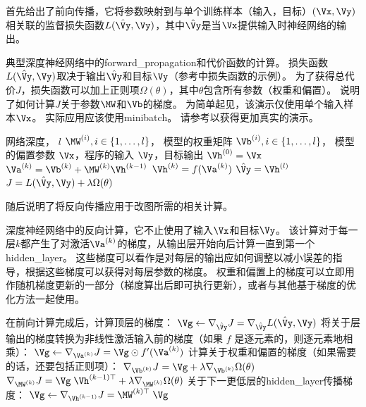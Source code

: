 首先给出了前向传播，它将参数映射到与单个训练样本（输入，目标）$(\Vx,\Vy)$相关联的监督损失函数$L(\hat{\Vy}, \Vy)$，其中$\hat{\Vy}$是当$\Vx$提供输入时神经网络的输出。
\begin{algorithm}[ht]
\caption{典型深度神经网络中的\gls{forward_propagation}和代价函数的计算。
损失函数$L(\hat{\Vy}, \Vy)$取决于输出$\hat{\Vy}$和目标$\Vy$（参考中损失函数的示例）。
为了获得总代价$J$，损失函数可以加上正则项$\Omega(\theta)$，其中$\theta$包含所有参数（权重和偏置）。
说明了如何计算$J$关于参数$\MW$和$\Vb$的梯度。 为简单起见，该演示仅使用单个输入样本$\Vx$。
实际应用应该使用\gls{minibatch}。
请参考以获得更加真实的演示。}
\label{alg:mlp-fprop}
\begin{algorithmic}
\REQUIRE 网络深度， $l$
\REQUIRE $\MW^{(i)}, i \in \{ 1, \dots, l\}$， 模型的权重矩阵
\REQUIRE $\Vb^{(i)}, i \in \{ 1, \dots, l\}$， 模型的偏置参数
\REQUIRE $\Vx$，程序的输入
\REQUIRE $\Vy$，目标输出
\STATE $\Vh^{(0)}=\Vx$
 \STATE $\Va^{(k)} = \Vb^{(k)} + \MW^{(k)} \Vh^{(k-1)}$
 \STATE $\Vh^{(k)} = f(\Va^{(k)})$
\ENDFOR
\STATE $\hat{\Vy} = \Vh^{(l)}$
\STATE $J = L(\hat{\Vy},\Vy) + \lambda \Omega(\theta)$
\end{algorithmic}
\end{algorithm}

随后说明了将反向传播应用于改图所需的相关计算。
\begin{algorithm}[htbp]
\caption{深度神经网络中的反向计算，它不止使用了输入$\Vx $和目标$\Vy$。
该计算对于每一层$k$都产生了对激活$\Va^{(k)}$的梯度，从输出层开始向后计算一直到第一个\gls{hidden_layer}。
这些梯度可以看作是对每层的输出应如何调整以减小误差的指导，根据这些梯度可以获得对每层参数的梯度。
权重和偏置上的梯度可以立即用作随机梯度更新的一部分（梯度算出后即可执行更新），或者与其他基于梯度的优化方法一起使用。
}
\label{alg:mlp-bprop}
\begin{algorithmic}
\STATE 在前向计算完成后，计算顶层的梯度：
\STATE $\Vg \leftarrow \nabla_{\hat{\Vy}} J = \nabla_{\hat{\Vy}} L(\hat{\Vy},\Vy)$
\STATE 将关于层输出的梯度转换为非线性激活输入前的梯度（如果 $f$ 是逐元素的，则逐元素地相乘）：
  \STATE $\Vg \leftarrow \nabla_{\Va^{(k)}} J = \Vg \odot f'(\Va^{(k)})$
  \STATE 计算关于权重和偏置的梯度（如果需要的话，还要包括正则项）：
  \STATE $\nabla_{\Vb^{(k)}} J = \Vg + \lambda \nabla_{\Vb^{(k)}} \Omega(\theta)$
  \STATE $\nabla_{\MW^{(k)}} J = \Vg \; \Vh^{(k-1)\top} + \lambda \nabla_{\MW^{(k)}} \Omega(\theta)$
  \STATE 关于下一更低层的\gls{hidden_layer}传播梯度：
  \STATE $\Vg \leftarrow \nabla_{\Vh^{(k-1)}} J = \MW^{(k)\top} \; \Vg$
\ENDFOR
\end{algorithmic}
\end{algorithm}

